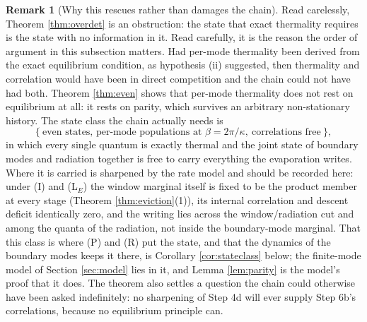 \documentclass[11pt]{article}
\theoremstyle{definition}
\newtheorem{remark}[theorem]{Remark}
\begin{document}
\begin{remark}[Why this rescues rather than damages the chain]\label{rem:rescue}
Read carelessly, Theorem \ref{thm:overdet} is an obstruction: the state that exact thermality requires is the state with no information in it. Read carefully, it is the reason the order of argument in this subsection matters. Had per-mode thermality been derived from the exact equilibrium condition, as hypothesis (ii) suggested, then thermality and correlation would have been in direct competition and the chain could not have had both. Theorem \ref{thm:even} shows that per-mode thermality does not rest on equilibrium at all: it rests on parity, which survives an arbitrary non-stationary history. The state class the chain actually needs is
\[
\bigl\{\ \text{even states, per-mode populations at } \beta = 2\pi/\kappa, \ \text{correlations free}\ \bigr\},
\]
in which every single quantum is exactly thermal and the joint state of boundary modes and radiation together is free to carry everything the evaporation writes. Where it is carried is sharpened by the rate model and should be recorded here: under (I) and (L$_E$) the window marginal itself is fixed to be the product member at every stage (Theorem \ref{thm:eviction}(1)), its internal correlation and descent deficit identically zero, and the writing lies across the window/radiation cut and among the quanta of the radiation, not inside the boundary-mode marginal. That this class is where (P) and (R) put the state, and that the dynamics of the boundary modes keeps it there, is Corollary \ref{cor:stateclass} below; the finite-mode model of Section \ref{sec:model} lies in it, and Lemma \ref{lem:parity} is the model's proof that it does. The theorem also settles a question the chain could otherwise have been asked indefinitely: no sharpening of Step 4d will ever supply Step 6b's correlations, because no equilibrium principle can.
\end{remark}
\end{document}
